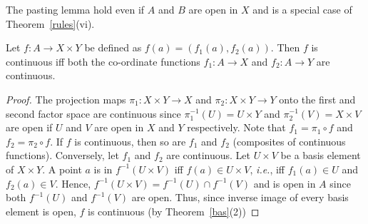 \documentclass[a4paper,english,12pt]{article}
\begin{document}
The pasting lemma hold even if $A$ and $B$ are open in $X$ and is a special case of Theorem~\ref{rules}(vi).

\begin{thm}
Let $f:A\rightarrow X\times Y$ be defined as $f(a)=(f_1(a),f_2(a))$. Then $f$ is continuous iff both the co-ordinate functions $f_1:A\rightarrow X$ and $f_2:A\rightarrow Y$ are continuous.
\end{thm}
\begin{proof}
The projection maps $\pi_1:X\times Y\rightarrow X$ and $\pi_2:X\times Y\rightarrow Y$ onto the first and second factor space are continuous since $\pi_1^{-1}(U)=U\times Y$ and $\pi_2^{-1}(V)=X\times V$ are open if $U$ and $V$ are open in $X$ and $Y$ respectively. Note that $f_1=\pi_1\circ f$ and $f_2=\pi_2\circ f$.
If $f$ is continuous, then so are $f_1$ and $f_2$ (composites of continuous functions).
Conversely, let $f_1$ and $f_2$ are continuous. Let $U\times V$ be a basis element of  $X\times Y$. A point $a$ is in $f^{-1}(U\times V)$ iff $f(a)\in U\times V$, \emph{i.e.}, iff $f_1(a)\in U$ and $f_2(a)\in V$. Hence, $f^{-1}(U\times V)=f^{-1}(U)\cap f^{-1}(V)$ and is open in $A$ since both $f^{-1}(U)$ and $f^{-1}(V)$ are open. Thus, since inverse image of every basis element is open, $f$ is continuous (by Theorem~\ref{bas}(2))
\end{proof}
\end{document}

